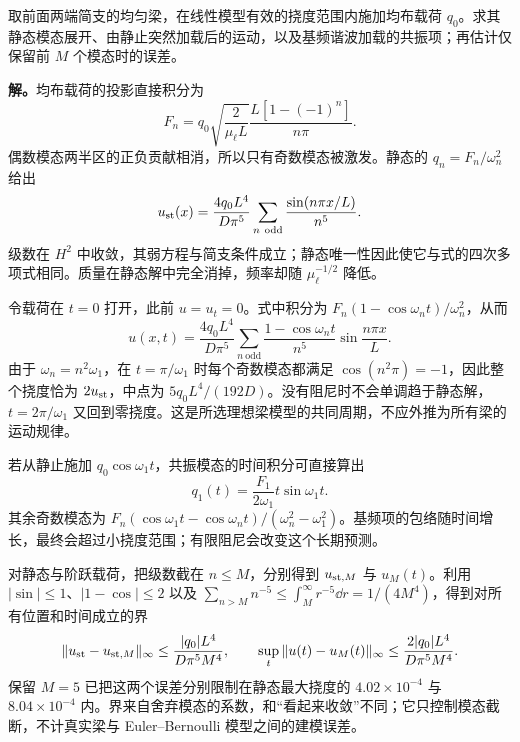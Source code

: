 \begin{exbox}
取前面两端简支的均匀梁，在线性模型有效的挠度范围内施加均布载荷 $q_0$。求其静态模态展开、由静止突然加载后的运动，以及基频谐波加载的共振项；再估计仅保留前 $M$ 个模态时的误差。

\textbf{解。}均布载荷的投影直接积分为
\[
 F_n=q_0\sqrt{\frac{2}{\mu_\ell L}}\frac{L[1-(-1)^n]}{n\pi}.
\]
偶数模态两半区的正负贡献相消，所以只有奇数模态被激发。静态的 $q_n=F_n/\omega_n^2$ 给出
\[
 u_{\rm st}(x)=\frac{4q_0L^4}{D\pi^5}
 \sum_{n\ \mathrm{odd}}\frac{\sin(n\pi x/L)}{n^5}.
\]
级数在 $H^2$ 中收敛，其弱方程与简支条件成立；静态唯一性因此使它与式的四次多项式相同。质量在静态解中完全消掉，频率却随 $\mu_\ell^{-1/2}$ 降低。

令载荷在 $t=0$ 打开，此前 $u=u_t=0$。式中积分为 $F_n(1-\cos\omega_nt)/\omega_n^2$，从而
\begin{equation}
 u(x,t)=\frac{4q_0L^4}{D\pi^5}
 \sum_{n\ \mathrm{odd}}\frac{1-\cos\omega_nt}{n^5}\sin\frac{n\pi x}{L}.
 \label{eq:phys-cont-beam-step-response}
\end{equation}
由于 $\omega_n=n^2\omega_1$，在 $t=\pi/\omega_1$ 时每个奇数模态都满足 $\cos(n^2\pi)=-1$，因此整个挠度恰为 $2u_{\rm st}$，中点为 $5q_0L^4/(192D)$。没有阻尼时不会单调趋于静态解，$t=2\pi/\omega_1$ 又回到零挠度。这是所选理想梁模型的共同周期，不应外推为所有梁的运动规律。

若从静止施加 $q_0\cos\omega_1t$，共振模态的时间积分可直接算出
\[
 q_1(t)=\frac{F_1}{2\omega_1}t\sin\omega_1t.
\]
其余奇数模态为 $F_n(\cos\omega_1t-\cos\omega_nt)/(\omega_n^2-\omega_1^2)$。基频项的包络随时间增长，最终会超过小挠度范围；有限阻尼会改变这个长期预测。

对静态与阶跃载荷，把级数截在 $n\le M$，分别得到 $u_{{\rm st},M}$ 与 $u_M(t)$。利用 $|\sin|\le1$、$|1-\cos|\le2$ 以及 $\sum_{n>M}n^{-5}\le\int_M^\infty r^{-5}\dd r=1/(4M^4)$，得到对所有位置和时间成立的界
\begin{equation}
 \|u_{\rm st}-u_{{\rm st},M}\|_\infty
 \le\frac{|q_0|L^4}{D\pi^5M^4},\qquad
 \sup_t\|u(t)-u_M(t)\|_\infty
 \le\frac{2|q_0|L^4}{D\pi^5M^4}.
 \label{eq:phys-cont-beam-modal-tail}
\end{equation}
保留 $M=5$ 已把这两个误差分别限制在静态最大挠度的 $4.02\times10^{-4}$ 与 $8.04\times10^{-4}$ 内。界来自舍弃模态的系数，和“看起来收敛”不同；它只控制模态截断，不计真实梁与 Euler--Bernoulli 模型之间的建模误差。
\end{exbox}

